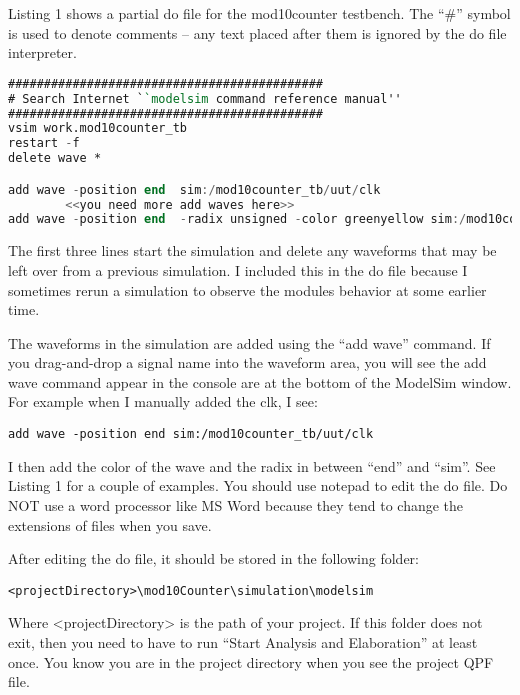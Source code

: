 Listing 1 shows a partial do file for the mod10counter testbench. The
``\#'' symbol is used to denote comments -- any text placed after them
is ignored by the do file interpreter.

\begin{lstlisting}[language=Verilog,
 caption={A partial do file for the mod10counter.},
basicstyle=\tiny\ttfamily,
 label={listing:mod10Counter},
 frame=single]
############################################
# Search Internet ``modelsim command reference manual''
############################################
vsim work.mod10counter_tb
restart -f
delete wave *

add wave -position end  sim:/mod10counter_tb/uut/clk
        <<you need more add waves here>>
add wave -position end  -radix unsigned -color greenyellow sim:/mod10counter_tb/uut/currentCount
 \end{lstlisting}

The first three lines start the simulation and delete any waveforms that
may be left over from a previous simulation. I included this in the do
file because I sometimes rerun a simulation to observe the modules
behavior at some earlier time.

The waveforms in the simulation are added using the ``add wave''
command. If you drag-and-drop a signal name into the waveform area, you
will see the add wave command appear in the console are at the bottom of
the ModelSim window. For example when I manually added the clk, I see:

\begin{verbatim}
add wave -position end sim:/mod10counter_tb/uut/clk
\end{verbatim}

I then add the color of the wave and the radix in between ``end'' and
``sim''. See Listing 1 for a couple of examples. You should use notepad
to edit the do file. Do NOT use a word processor like MS Word because
they tend to change the extensions of files when you save.

After editing the do file, it should be stored in the following folder:

\begin{verbatim}
<projectDirectory>\mod10Counter\simulation\modelsim
\end{verbatim}

Where \textless projectDirectory\textgreater{} is the path of your
project. If this folder does not exit, then you need to have to run
``Start Analysis and Elaboration'' at least once. You know you are in
the project directory when you see the project QPF file.

